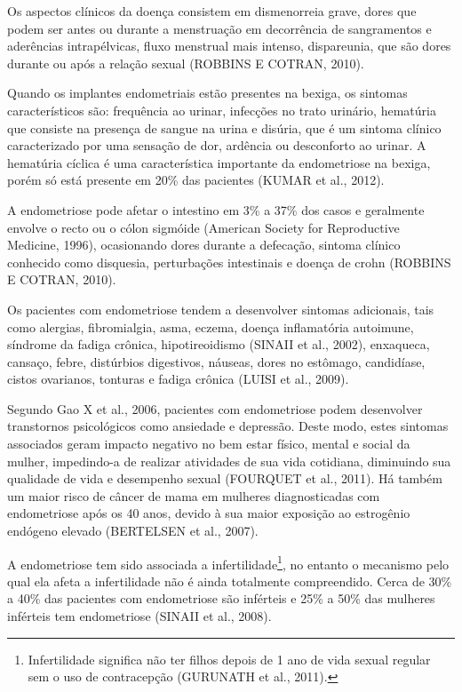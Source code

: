 \documentclass[12pt]{article} %
\begin{document}
Os aspectos clínicos da doença consistem em dismenorreia grave, dores que podem ser antes ou durante a menstruação em decorrência de sangramentos e aderências intrapélvicas, fluxo menstrual mais intenso,
dispareunia, que são dores durante ou após a relação sexual (ROBBINS E COTRAN, 2010).

Quando os implantes endometriais estão presentes na bexiga, os sintomas característicos são: frequência ao urinar, infecções no trato urinário, hematúria que consiste na presença de sangue na urina e disúria, que é um sintoma clínico caracterizado por uma sensação de dor, ardência ou desconforto ao urinar.  A hematúria cíclica é uma característica importante da endometriose na bexiga, porém só
está presente em 20\% das pacientes (KUMAR et al., 2012). 

A endometriose pode afetar o intestino em 3\% a 37\% dos
casos e geralmente envolve o recto ou o cólon sigmóide (American Society for Reproductive Medicine, 1996), ocasionando dores durante a defecação, sintoma clínico conhecido como disquesia, perturbações intestinais e doença de crohn (ROBBINS E COTRAN, 2010).

Os pacientes com endometriose tendem a desenvolver sintomas
adicionais, tais como alergias, fibromialgia, asma, eczema, doença
inflamatória autoimune, síndrome da fadiga crônica, hipotireoidismo
(SINAII et al., 2002), enxaqueca, cansaço, febre, distúrbios digestivos, náuseas, dores no estômago,
candidíase, cistos ovarianos, tonturas e fadiga crônica (LUISI et al., 2009).


Segundo Gao X et al., 2006, pacientes com endometriose podem
desenvolver transtornos psicológicos como ansiedade e depressão.
Deste modo, estes sintomas associados geram impacto negativo no bem estar físico, mental e social da mulher, impedindo-a de realizar
atividades de sua vida cotidiana, diminuindo sua qualidade de vida e
desempenho sexual (FOURQUET et al., 2011). Há também um maior risco de câncer de mama em mulheres diagnosticadas
com endometriose após os 40 anos, devido à sua maior exposição ao
estrogênio endógeno elevado (BERTELSEN et al., 2007).


A endometriose tem sido associada a infertilidade\footnote{Infertilidade significa não ter filhos depois de 1 ano de vida sexual regular sem o uso de contracepção (GURUNATH et al., 2011).}, no entanto o mecanismo pelo qual ela afeta a infertilidade não é ainda totalmente compreendido. Cerca de 30\% a 40\% das pacientes com endometriose são inférteis e 25\% a 50\% das mulheres inférteis tem endometriose (SINAII et al., 2008).
\end{document}
